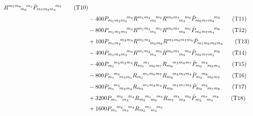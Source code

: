 \begin{align}
       R^{{m_{7}} {m_{8}}}\!_{{m_{6}}}\!^{{m_{3}}}
       \Pbar_{{m_{7}} {m_{8}} {m_{4}}}\!^{{m_{5}}}
  \tag{T10}\label{T10}\\[3pt]
&-400 P_{{m_{1}} {m_{2}} {m_{3}}}\!^{{m_{4}}}
       R^{{m_{1}} {m_{2}}}\!_{{m_{5}}}\!^{{m_{3}}}
       R^{{m_{6}} {m_{7}}}\!_{{m_{4}}}\!^{{m_{8}}}
       \Pbar_{{m_{6}} {m_{7}} {m_{8}}}\!^{{m_{5}}}
  \tag{T11}\label{T11}\\[3pt]
&-800 P_{{m_{1}} {m_{2}} {m_{3}}}\!^{{m_{4}}}
       R^{{m_{1}} {m_{2}}}\!_{{m_{5}}}\!^{{m_{3}}}
       R^{{m_{6}} {m_{7}}}\!_{{m_{8}}}\!^{{m_{5}}}
       \Pbar_{{m_{6}} {m_{7}} {m_{4}}}\!^{{m_{8}}}
  \tag{T12}\label{T12}\\[3pt]
&+100 P_{{m_{1}} {m_{2}}}\!^{{m_{3}} {m_{4}}}
       R^{{m_{1}} {m_{2}}}\!_{{m_{5}} {m_{6}}}
       R^{{m_{5}} {m_{6}} {m_{7}} {m_{8}}}
       \Pbar_{{m_{7}} {m_{8}} {m_{3}} {m_{4}}}
  \tag{T13}\label{T13}\\[3pt]
&-400 P_{{m_{1}} {m_{2}} {m_{3}}}\!^{{m_{4}}}
       R^{{m_{1}} {m_{2}}}\!_{{m_{4}}}\!^{{m_{5}}}
       R^{{m_{6}} {m_{7}}}\!_{{m_{8}}}\!^{{m_{3}}}
       \Pbar_{{m_{6}} {m_{7}} {m_{5}}}\!^{{m_{8}}}
  \tag{T14}\label{T14}\\[3pt]
&-400 P_{{m_{1}}}\!^{{m_{2}} {m_{3}} {m_{4}}}
       R_{{m_{5}}}\!^{{m_{1}}}\!_{{m_{6}} {m_{7}}}
       R_{{m_{8}}}\!^{{m_{5}} {m_{6}} {m_{7}}}
       \Pbar_{{m_{2}}}\!^{{m_{8}}}\!_{{m_{3}} {m_{4}}}
  \tag{T15}\label{T15}\\[3pt]
&-800 P_{{m_{1}}}\!^{{m_{2}}}\!_{{m_{3}} {m_{4}}}
       R_{{m_{5}}}\!^{{m_{1}} {m_{6}} {m_{7}}}
       R_{{m_{8}}}\!^{{m_{5}} {m_{3}} {m_{4}}}
       \Pbar_{{m_{2}}}\!^{{m_{8}}}\!_{{m_{6}} {m_{7}}}
  \tag{T16}\label{T16}\\[3pt]
&-800 P_{{m_{1}}}\!^{{m_{2}}}\!_{{m_{3}} {m_{4}}}
       R_{{m_{5}}}\!^{{m_{1}} {m_{3}} {m_{4}}}
       R_{{m_{6}}}\!^{{m_{5}} {m_{7}} {m_{8}}}
       \Pbar_{{m_{2}}}\!^{{m_{6}}}\!_{{m_{7}} {m_{8}}}
  \tag{T17}\label{T17}\\[3pt]
&+3200 P_{{m_{1}}}\!^{{m_{2}}}\!_{{m_{3}}}\!^{{m_{4}}}
        R_{{m_{5}}}\!^{{m_{1}}}\!_{{m_{6}}}\!^{{m_{3}}}
        R_{{m_{7}}}\!^{{m_{5}}}\!_{{m_{8}}}\!^{{m_{6}}}
        \Pbar_{{m_{2}}}\!^{{m_{7}}}\!_{{m_{4}}}\!^{{m_{8}}}
  \tag{T18}\label{T18}\\[3pt]
&+1600 P_{{m_{1}}}\!^{{m_{2}}}\!_{{m_{3}}}\!^{{m_{4}}}
        R_{{m_{5}}}\!^{{m_{1}}}\!_{{m_{4}}}\!^{{m_{6}}}

\end{align}
